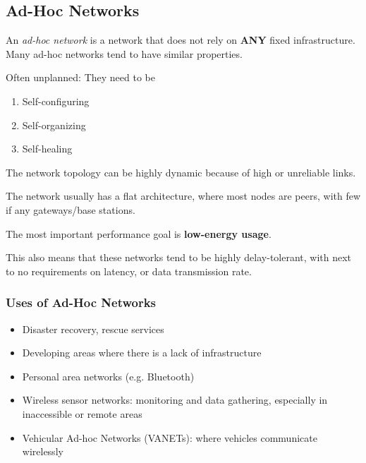 \subsection{Ad-Hoc Networks}\label{subsec:Ad_Hoc_Networks}
\begin{definition}\label{def:Ad_Hoc_Network}
  An \emph{ad-hoc network} is a network that does not rely on \textbf{ANY} fixed infrastructure.
  Many ad-hoc networks tend to have similar properties.
  \begin{propertylist}
  \item Often unplanned: They need to be
    \begin{enumerate}[noitemsep]
    \item Self-configuring
    \item Self-organizing
    \item Self-healing
    \end{enumerate}

  \item The network topology can be highly dynamic because of high  or unreliable links.
  \item The network usually has a flat architecture, where most nodes are peers, with few if any gateways/base stations.
  \item The most important performance goal is \textbf{low-energy usage}.
  \end{propertylist}

  This also means that these networks tend to be highly delay-tolerant, with next to no requirements on latency, or data transmission rate.
\end{definition}

\subsubsection{Uses of Ad-Hoc Networks}\label{subsubsec:Uses_Ad_Hoc_Network}
\begin{itemize}[noitemsep]
\item Disaster recovery, rescue services
\item Developing areas where there is a lack of infrastructure
\item Personal area networks (e.g. Bluetooth)
\item Wireless sensor networks: monitoring and data gathering, especially in inaccessible or remote areas
\item Vehicular Ad-hoc Networks (VANETs): where vehicles communicate wirelessly
\end{itemize}

